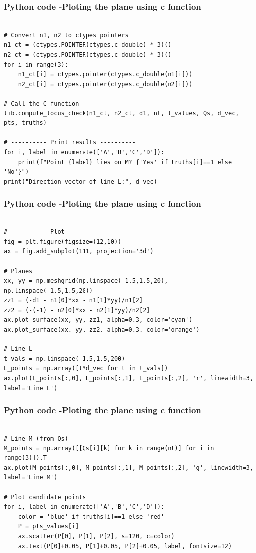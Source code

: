 \documentclass{beamer}
\begin{document}
	
\begin{frame}[fragile]                              
	\frametitle{Python code -Ploting the plane using c function} 
	\begin{lstlisting}

# Convert n1, n2 to ctypes pointers
n1_ct = (ctypes.POINTER(ctypes.c_double) * 3)()
n2_ct = (ctypes.POINTER(ctypes.c_double) * 3)()
for i in range(3):
    n1_ct[i] = ctypes.pointer(ctypes.c_double(n1[i]))
    n2_ct[i] = ctypes.pointer(ctypes.c_double(n2[i]))

# Call the C function
lib.compute_locus_check(n1_ct, n2_ct, d1, nt, t_values, Qs, d_vec, pts, truths)

# ---------- Print results ----------
for i, label in enumerate(['A','B','C','D']):
    print(f"Point {label} lies on M? {'Yes' if truths[i]==1 else 'No'}")
print("Direction vector of line L:", d_vec)
\end{lstlisting}
\end{frame}

	
\begin{frame}[fragile]                              
	\frametitle{Python code -Ploting the plane using c function} 
	\begin{lstlisting}

# ---------- Plot ----------
fig = plt.figure(figsize=(12,10))
ax = fig.add_subplot(111, projection='3d')

# Planes
xx, yy = np.meshgrid(np.linspace(-1.5,1.5,20), np.linspace(-1.5,1.5,20))
zz1 = (-d1 - n1[0]*xx - n1[1]*yy)/n1[2]
zz2 = (-(-1) - n2[0]*xx - n2[1]*yy)/n2[2]
ax.plot_surface(xx, yy, zz1, alpha=0.3, color='cyan')
ax.plot_surface(xx, yy, zz2, alpha=0.3, color='orange')

# Line L
t_vals = np.linspace(-1.5,1.5,200)
L_points = np.array([t*d_vec for t in t_vals])
ax.plot(L_points[:,0], L_points[:,1], L_points[:,2], 'r', linewidth=3, label='Line L')
\end{lstlisting}
\end{frame}

	
\begin{frame}[fragile]                              
	\frametitle{Python code -Ploting the plane using c function} 
	\begin{lstlisting}

# Line M (from Qs)
M_points = np.array([[Qs[i][k] for k in range(nt)] for i in range(3)]).T
ax.plot(M_points[:,0], M_points[:,1], M_points[:,2], 'g', linewidth=3, label='Line M')

# Plot candidate points
for i, label in enumerate(['A','B','C','D']):
    color = 'blue' if truths[i]==1 else 'red'
    P = pts_values[i]
    ax.scatter(P[0], P[1], P[2], s=120, c=color)
    ax.text(P[0]+0.05, P[1]+0.05, P[2]+0.05, label, fontsize=12)
\end{lstlisting}
\end{frame}
\end{document}
